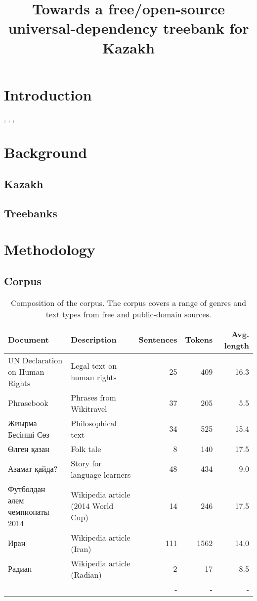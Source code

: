\documentclass[a4paper,11pt, onecolumn]{article}
\title{Towards a free/open-source universal-dependency treebank for Kazakh}
\begin{document}
\maketitleabstract{}


\section{Introduction}

\citet{Lynn12}, \citet{Atalay03}, \citet{Oflazer03}, \citet{DeMarneffe14}

\section{Background}

\subsection{Kazakh}


\subsection{Treebanks} %


\section{Methodology}

\subsection{Corpus}

\begin{table}
  \centering
\begin{small}
  \begin{tabular}{|l|l|r|r|r|}
    \hline
    \textbf{Document} & \textbf{Description} & \textbf{Sentences} & \textbf{Tokens} & \textbf{Avg. length}\\
    \hline
    UN Declaration on Human Rights & Legal text on human rights & 25 & 409 & 16.3 \\
    Phrasebook & Phrases from Wikitravel & 37 & 205 & 5.5 \\
    Жиырма Бесінші Сөз & Philosophical text & 34 & 525 & 15.4 \\ 
    Өлген қазан & Folk tale & 8 & 140 & 17.5 \\
    Азамат қайда? & Story for language learners & 48 & 434 & 9.0 \\
    Футболдан әлем чемпионаты 2014  & Wikipedia article (2014 World Cup) & 14 & 246 & 17.5 \\
    Иран & Wikipedia article (Iran) & 111 & 1562 & 14.0 \\
    Радиан & Wikipedia article (Radian) & 2 & 17 & 8.5 \\
    \hline
    \multicolumn{2}{c|}{~} & - & - & - \\\cline{3-5}
  \end{tabular}
\end{small}
  \caption{Composition of the corpus. The corpus covers a range of genres and text types from 
    free and public-domain sources.}
\end{table}
\end{document}
